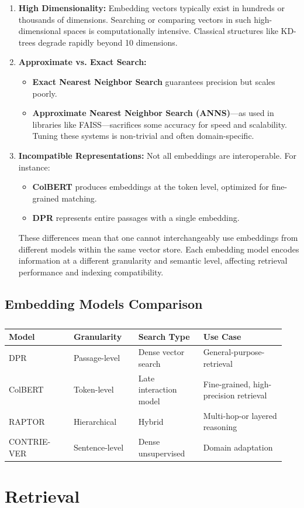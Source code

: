 \documentclass[twocolumn, 10pt]{article}
\begin{document}
\begin{enumerate}
    \item \textbf{High Dimensionality:} Embedding vectors typically exist in hundreds or thousands of dimensions. Searching or comparing vectors in such high-dimensional spaces is computationally intensive. Classical structures like KD-trees degrade rapidly beyond 10 dimensions.
    
    \item \textbf{Approximate vs. Exact Search:}
    \begin{itemize}
        \item \textbf{Exact Nearest Neighbor Search} guarantees precision but scales poorly.
        \item \textbf{Approximate Nearest Neighbor Search (ANNS)}—as used in libraries like FAISS—sacrifices some accuracy for speed and scalability. Tuning these systems is non-trivial and often domain-specific.
    \end{itemize}
    
    \item \textbf{Incompatible Representations:} 
    Not all embeddings are interoperable. For instance:
    \begin{itemize}
        \item \textbf{ColBERT} produces embeddings at the token level, optimized for fine-grained matching.
        \item \textbf{DPR} represents entire passages with a single embedding.
    \end{itemize}
    These differences mean that one cannot interchangeably use embeddings from different models within the same vector store. Each embedding model encodes information at a different granularity and semantic level, affecting retrieval performance and indexing compatibility.
\end{enumerate}

\subsection*{Embedding Models Comparison}

\begin{table}[H]
\centering
\begin{tabular}{|p{0.22\linewidth}|p{0.22\linewidth}|p{0.22\linewidth}|p{0.28\linewidth}|}
\hline
\textbf{Model} & \textbf{Granularity} & \textbf{Search Type} & \textbf{Use Case} \\
\hline
DPR & Passage-level & Dense vector search& General-purpose-retrieval \\
\hline
ColBERT & Token-level & Late interaction model& Fine-grained, high-precision retrieval \\
\hline
RAPTOR & Hierarchical & Hybrid & Multi-hop-or layered reasoning \\
\hline
CONTRIE-VER & Sentence-level & Dense unsupervised & Domain adaptation \\
\hline
\end{tabular}
\caption{}
\label{tab:embedding-models}
\end{table}


\section{Retrieval}



\end{document}
